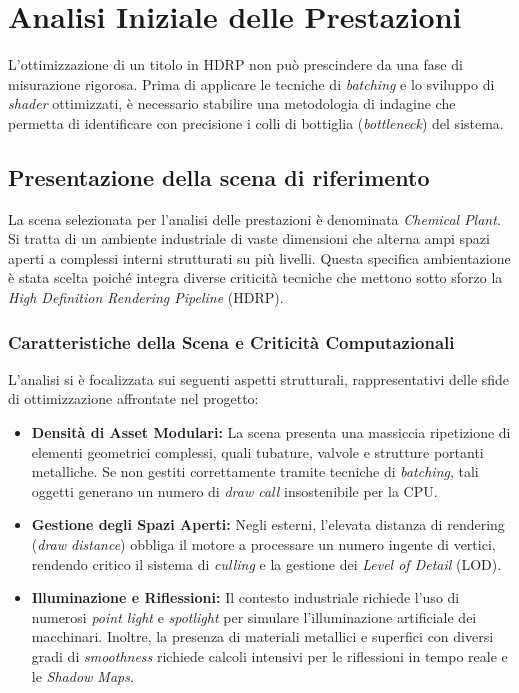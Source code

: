 \chapter{Analisi Iniziale delle Prestazioni}

L'ottimizzazione di un titolo in HDRP non può prescindere da una fase di misurazione rigorosa. Prima di applicare le tecniche di \textit{batching} e lo sviluppo di \textit{shader} ottimizzati, è necessario stabilire una metodologia di indagine che permetta di identificare con precisione i colli di bottiglia (\textit{bottleneck}) del sistema.

\section{Presentazione della scena di riferimento}

La scena selezionata per l'analisi delle prestazioni è denominata \textit{Chemical Plant}. Si tratta di un ambiente industriale di vaste dimensioni che alterna ampi spazi aperti a complessi interni strutturati su più livelli. Questa specifica ambientazione è stata scelta poiché integra diverse criticità tecniche che mettono sotto sforzo la \textit{High Definition Rendering Pipeline} (HDRP).

\subsection{Caratteristiche della Scena e Criticità Computazionali}

L'analisi si è focalizzata sui seguenti aspetti strutturali, rappresentativi delle sfide di ottimizzazione affrontate nel progetto:

\begin{itemize}
    \item \textbf{Densità di Asset Modulari:} La scena presenta una massiccia ripetizione di elementi geometrici complessi, quali tubature, valvole e strutture portanti metalliche. Se non gestiti correttamente tramite tecniche di \textit{batching}, tali oggetti generano un numero di \textit{draw call} insostenibile per la CPU.
    \item \textbf{Gestione degli Spazi Aperti:} Negli esterni, l'elevata distanza di rendering (\textit{draw distance}) obbliga il motore a processare un numero ingente di vertici, rendendo critico il sistema di \textit{culling} e la gestione dei \textit{Level of Detail} (LOD).
    \item \textbf{Illuminazione e Riflessioni:} Il contesto industriale richiede l'uso di numerosi \textit{point light} e \textit{spotlight} per simulare l'illuminazione artificiale dei macchinari. Inoltre, la presenza di materiali metallici e superfici con diversi gradi di \textit{smoothness} richiede calcoli intensivi per le riflessioni in tempo reale e le \textit{Shadow Maps}.
\end{itemize}

